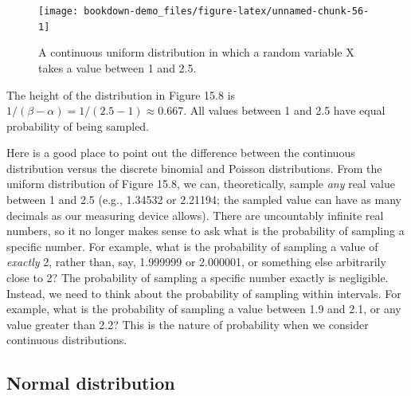 \documentclass[
  openany]{scrbook}
\begin{document}
\begin{figure}
\texttt{[image: bookdown-demo\_files/figure-latex/unnamed-chunk-56-1]} \caption{A continuous uniform distribution in which a random variable X takes a value between 1 and 2.5.}\label{fig:unnamed-chunk-56}
\end{figure}

The height of the distribution in Figure 15.8 is \(1/(\beta - \alpha) = 1/(2.5 - 1) \approx 0.667\).
All values between 1 and 2.5 have equal probability of being sampled.

Here is a good place to point out the difference between the continuous distribution versus the discrete binomial and Poisson distributions.
From the uniform distribution of Figure 15.8, we can, theoretically, sample \emph{any} real value between 1 and 2.5 (e.g., 1.34532 or 2.21194; the sampled value can have as many decimals as our measuring device allows).
There are uncountably infinite real numbers, so it no longer makes sense to ask what is the probability of sampling a specific number.
For example, what is the probability of sampling a value of \emph{exactly} 2, rather than, say, 1.999999 or 2.000001, or something else arbitrarily close to 2?
The probability of sampling a specific number exactly is negligible.
Instead, we need to think about the probability of sampling within intervals.
For example, what is the probability of sampling a value between 1.9 and 2.1, or any value greater than 2.2?
This is the nature of probability when we consider continuous distributions.

\hypertarget{normal-distribution}{%
\subsection{Normal distribution}\label{normal-distribution}}
\end{document}
